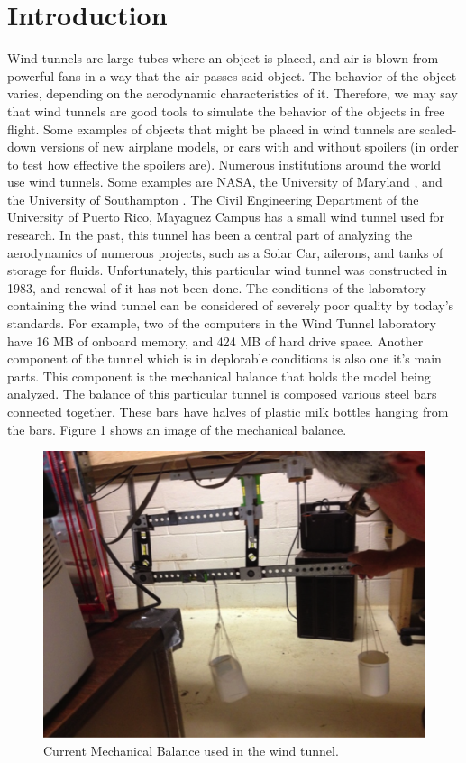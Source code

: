\section{Introduction}
		Wind tunnels \cite{ref:intro1} are large tubes where an object is placed, and air is blown from 
		powerful fans in a way that the air passes said object. The behavior of the object 
		varies, depending on the aerodynamic characteristics of it. Therefore, we may say 
		that wind tunnels are good tools to simulate the behavior of the objects in free 
		flight. Some examples of objects that might be placed in wind tunnels are scaled-down 
		versions of new airplane models, or cars with and without spoilers (in order to test
		how effective the spoilers are). Numerous institutions around the world use wind tunnels. 
		Some examples are NASA, the University of Maryland \cite{ref:intro2}, and the University 
		of Southampton \cite{ref:intro3}. The Civil Engineering Department of the University of 
		Puerto Rico, Mayaguez Campus \cite{ref:intro4} has a small wind tunnel used for research. 
		In the past, this tunnel has been a central part of analyzing the aerodynamics of numerous
		projects, such as a Solar Car, ailerons, 
		and tanks of storage for fluids. Unfortunately, this particular wind tunnel was constructed in 1983, and renewal of it has not been done. The conditions of the laboratory 
		containing the wind tunnel can be considered of severely poor quality by today’s standards. 
		For example, two of the computers in the Wind Tunnel laboratory have 16 MB of onboard 
		memory, and 424 MB of hard drive space. Another component of the tunnel which is in 
		deplorable conditions is also one it’s main parts. This component is the 
		mechanical balance that holds the model being analyzed. The balance of this particular
		tunnel is composed various steel bars connected together. These bars have halves of 
		plastic milk bottles hanging from the bars.  Figure 1 shows an image of the mechanical balance.

		\begin{figure}[H]
			\centering
				\includegraphics[scale=0.7]{img/intro-1}
			\caption{Current Mechanical Balance used in the wind tunnel.}
		\end{figure}

